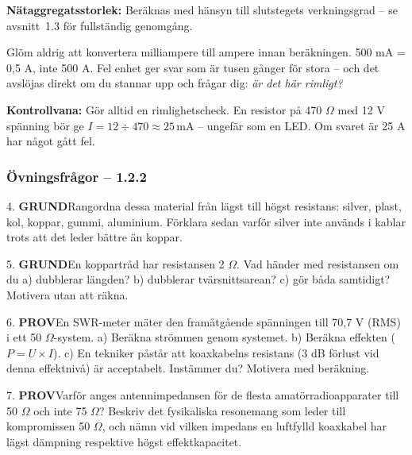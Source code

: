 \documentclass[a4paper,11pt,twoside]{book}
\newcommand{\emoji}[1]{{\emojifont #1}}
\newcommand{\qgrund}{\colorbox{greenpale}{\textcolor{greendark}{\headingfont\bfseries\tiny GRUND}}}
\newcommand{\qprov}{\colorbox{redpale}{\textcolor{reddark}{\headingfont\bfseries\tiny PROV}}}
\begin{document}
\textbf{Nätaggregatsstorlek:} Beräknas med hänsyn till slutstegets verkningsgrad – se avsnitt~1.3 för fullständig genomgång.

\begin{redbox}[title={\emoji{⚠️} Det absolut vanligaste misstaget}]
Glöm aldrig att konvertera milliampere till ampere innan beräkningen. 
500 mA = 0,5 A, inte 500 A. Fel enhet ger svar som är tusen gånger 
för stora – och det avslöjas direkt om du stannar upp och frågar dig: 
\emph{är det här rimligt?}

\textbf{Kontrollvana:} Gör alltid en rimlighetscheck. En resistor på 
470 $\Omega$ med 12 V spänning bör ge $I = 12 \div 470 \approx 
25\,\text{mA}$ – ungefär som en LED. Om svaret är 25 A har något 
gått fel.
\end{redbox}

\newpage

\subsubsection*{Övningsfrågor – 1.2.2}

\begin{qblock}{4.}
\qgrund\quad Rangordna dessa material från lägst till högst resistans: 
silver, plast, kol, koppar, gummi, aluminium. Förklara sedan varför 
silver inte används i kablar trots att det leder bättre än koppar.
\end{qblock}

\begin{qblock}{5.}
\qgrund\quad En koppartråd har resistansen 2 $\Omega$. Vad händer med 
resistansen om du a) dubblerar längden? b) dubblerar tvärsnittsarean? 
c) gör båda samtidigt? Motivera utan att räkna.
\end{qblock}

\begin{qblock}{6.}
\qprov\quad En SWR-meter mäter den framåtgående spänningen till 70,7 V 
(RMS) i ett 50 $\Omega$-system. a) Beräkna strömmen genom systemet. 
b) Beräkna effekten ($P = U \times I$). c) En tekniker påstår att 
koaxkabelns resistans (3 dB förlust vid denna effektnivå) är 
acceptabelt. Instämmer du? Motivera med beräkning.
\end{qblock}

\begin{qblock}{7.}
\qprov\quad Varför anges antennimpedansen för de flesta 
amatörradioapparater till 50 $\Omega$ och inte 75 $\Omega$? Beskriv 
det fysikaliska resonemang som leder till kompromissen 50 $\Omega$, 
och nämn vid vilken impedans en luftfylld koaxkabel har lägst dämpning 
respektive högst effektkapacitet.
\end{qblock}
\end{document}
